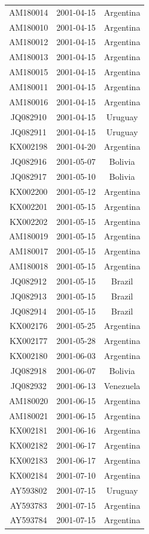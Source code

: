 \documentclass[a4paper,10pt]{article}
\begin{document}
\begin{center}
\begin{longtable}{ccc}
AM180014 & 2001-04-15 & Argentina \\
AM180010 & 2001-04-15 & Argentina \\
AM180012 & 2001-04-15 & Argentina \\
AM180013 & 2001-04-15 & Argentina \\
AM180015 & 2001-04-15 & Argentina \\
AM180011 & 2001-04-15 & Argentina \\
AM180016 & 2001-04-15 & Argentina \\
JQ082910 & 2001-04-15 & Uruguay \\
JQ082911 & 2001-04-15 & Uruguay \\
KX002198 & 2001-04-20 & Argentina \\
JQ082916 & 2001-05-07 & Bolivia \\
JQ082917 & 2001-05-10 & Bolivia \\
KX002200 & 2001-05-12 & Argentina \\
KX002201 & 2001-05-15 & Argentina \\
KX002202 & 2001-05-15 & Argentina \\
AM180019 & 2001-05-15 & Argentina \\
AM180017 & 2001-05-15 & Argentina \\
AM180018 & 2001-05-15 & Argentina \\
JQ082912 & 2001-05-15 & Brazil \\
JQ082913 & 2001-05-15 & Brazil \\
JQ082914 & 2001-05-15 & Brazil \\
KX002176 & 2001-05-25 & Argentina \\
KX002177 & 2001-05-28 & Argentina \\
KX002180 & 2001-06-03 & Argentina \\
JQ082918 & 2001-06-07 & Bolivia \\
JQ082932 & 2001-06-13 & Venezuela \\
AM180020 & 2001-06-15 & Argentina \\
AM180021 & 2001-06-15 & Argentina \\
KX002181 & 2001-06-16 & Argentina \\
KX002182 & 2001-06-17 & Argentina \\
KX002183 & 2001-06-17 & Argentina \\
KX002184 & 2001-07-10 & Argentina \\
AY593802 & 2001-07-15 & Uruguay \\
AY593783 & 2001-07-15 & Argentina \\
AY593784 & 2001-07-15 & Argentina \\

\end{longtable}
\end{center}
\end{document}
